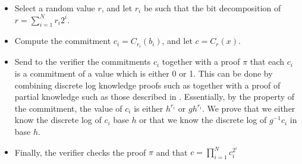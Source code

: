 \documentclass{article}
\begin{document}
\begin{itemize}
    \item Select a random value $r$, and let $r_i$ be such that the bit decomposition of $r = \sum_{i = 1}^N r_i 2^i$.
    \item Compute the commitment $c_i = C_{r_i}(b_i)$, and let $c = C_r(x)$.
    \item Send to the verifier the commitments $c_i$ together with a proof $\pi$ that each $c_i$ is a commitment of a value which is either 0 or 1. This can
          be done by combining discrete log knowledge proofs such as \cite{schnorrEfficientSignatureGeneration1991} together with a proof of partial knowledge such as those
          described in \cite{cramerProofsPartialKnowledge1994}. Essentially, by the property of the commitment, the value
          of $c_i$ is either $h^{r_i}$ or $g h^{r_i}$. We prove that we either know the discrete log of $c_i$ base $h$ or that we know
          the discrete log of $g^{-1} c_i$ in base $h$.
    \item Finally, the verifier checks the proof $\pi$ and that $c = \prod_{i=1}^N c_i^{2^i}$
\end{itemize}
\end{document}
